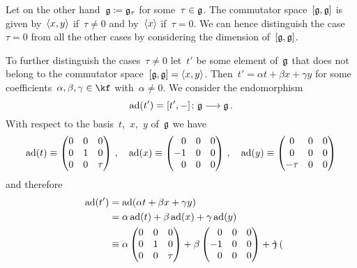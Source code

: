 \begin{example}
  Let on the other hand~$\mathfrak{g} \coloneqq \mathfrak{g}_\tau$ for some~$\tau \in \mathfrak{g}$.
  The commutator space~$[\mathfrak{g}, \mathfrak{g}]$ is given by~$\langle x, y\rangle$ if~$\tau \neq 0$ and by~$\langle x\rangle$ if~$\tau = 0$.
  We can hence distinguish the case~$\tau = 0$ from all the other cases by considering the dimension of~$[\mathfrak{g}, \mathfrak{g}]$.

  To further distinguish the cases~$\tau \neq 0$ let~$t'$ be some element of~$\mathfrak{g}$ that does not belong to the commutator space~$[\mathfrak{g}, \mathfrak{g}] = \langle x,y\rangle$.
  Then~$t' = \alpha t + \beta x + \gamma y$ for some coefficients~$\alpha, \beta, \gamma \in \kf$ with~$\alpha \neq 0$.
  We consider the endomorphism
  \[
    \ad(t')
    =
    [t', -]
    \colon
    \glie
    \to
    \glie \,.
  \]
  With respect to the basis~$t$,~$x$,~$y$ of~$\mathfrak{g}$ we have
  \[
    \ad(t)
    \equiv
    \begin{pmatrix}
      0 & 0 & 0     \\
      0 & 1 & 0     \\
      0 & 0 & \tau
    \end{pmatrix} \,,
    \quad
    \ad(x)
    \equiv
    \begin{pmatrix*}[r]
       0  & 0 & 0 \\
      -1  & 0 & 0 \\
       0  & 0 & 0
    \end{pmatrix*} \,,
    \quad
    \ad(y)
    \equiv
    \begin{pmatrix}
      0     & 0 & 0 \\
      0     & 0 & 0 \\
      -\tau & 0 & 0
    \end{pmatrix}
  \]
  and therefore
  \begin{align*}
    \ad(t')
    &=
    \ad(\alpha t + \beta x + \gamma y)
    \\
    &=
    \alpha \ad(t) + \beta \ad(x) + \gamma \ad(y)
    \\
    &\equiv
    \alpha
    \begin{pmatrix}
      0 & 0 & 0     \\
      0 & 1 & 0     \\
      0 & 0 & \tau
    \end{pmatrix}
    +
    \beta
    \begin{pmatrix*}[r]
       0  & 0 & 0 \\
      -1  & 0 & 0 \\
       0  & 0 & 0
    \end{pmatrix*}
    +
    \gamma
    \begin{pmatrix}

\end{pmatrix}
\end{align*}
\end{example}
